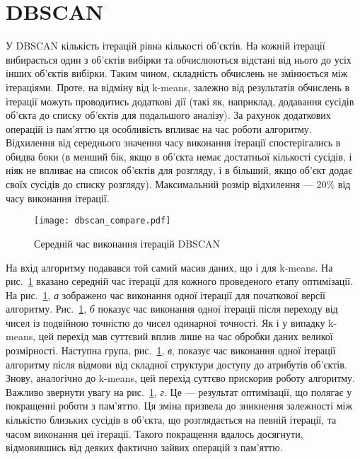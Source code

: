             \section{DBSCAN}
                У DBSCAN кількість ітерацій рівна кількості об’єктів. На кожній ітерації вибирається один з об’єктів вибірки та обчислюються відстані від нього до усіх інших об’єктів вибірки. Таким чином, складність обчислень не змінюється між ітераціями. Проте, на відміну від k-means, залежно від результатів обчислень в ітерації можуть проводитись додаткові дії (такі як, наприклад, додавання сусідів об’єкта до списку об’єктів для подальшого аналізу). За рахунок додаткових операцій із пам’яттю ця особливість впливає на час роботи алгоритму. Відхилення від середнього значення часу виконання ітерації спостерігались в обидва боки (в менший бік, якщо в об’єкта немає достатньої кількості сусідів, і ніяк не впливає на список об’єктів для розгляду, і в більший, якщо об’єкт додає своїх сусідів до списку розгляду). Максимальний розмір відхилення --- 20\% від часу виконання ітерації.
                
                \begin{figure}
                    \centering
                    \texttt{[image: dbscan\_compare.pdf]}
                    \caption{Середній час виконання ітерацій DBSCAN}\label{fig:dbscan_compare}
                \end{figure}
                
                На вхід алгоритму подавався той самий масив даних, що і для k-means. На рис.~\ref{fig:dbscan_compare} вказано середній час ітерації для кожного проведеного етапу оптимізації. На рис.~\ref{fig:dbscan_compare}, \emph{а} зображено час виконання одної ітерації для початкової версії алгоритму. Рис.~\ref{fig:dbscan_compare}, \emph{б} показує час виконання одної ітерації після переходу від чисел із подвійною точністю до чисел одинарної точності. Як і у випадку k-means, цей перехід мав суттєвий вплив лише на час обробки даних великої розмірності. Наступна група, рис.~\ref{fig:dbscan_compare}, \emph{в}, показує час виконання одної ітерації алгоритму після відмови від складної структури доступу до атрибутів об’єктів. Знову, аналогічно до k-means, цей перехід суттєво прискорив роботу алгоритму. Важливо звернути увагу на рис.~\ref{fig:dbscan_compare}, \emph{г}. Це --- результат оптимізації, що полягає у покращенні роботи з пам’яттю. Ця зміна призвела до зникнення залежності між кількістю близьких сусідів в об’єкта, що розглядається на певній ітерації, та часом виконання цеї ітерації. Такого покращення вдалось досягнути, відмовившись від деяких фактично зайвих операцій з пам’яттю.
                
